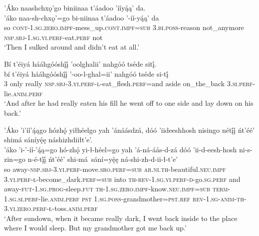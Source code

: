 \ea\label{ex:text2-6-1}
’Áko naashchxǫ’go biniinaa t’áadoo ’ííyą́ą’ da.\\
\gll ’áko	naa-sh-chxǫ’=go	bi-niinaa	t’áadoo	’-íí-yą́ą’	da\\
     so	\textsc{cont}-1.\textsc{sg}.\textsc{zero}.\textsc{impf}-mess\_up.\textsc{cont}.\textsc{impf}=\textsc{sub}	3.\textsc{bi}.\textsc{poss}-reason	not\_anymore	\textsc{nsp}.\textsc{sbj}-1.\textsc{sg}.\textsc{yi}.\textsc{perf}-eat.\textsc{perf}	not\\
\glt `Then I sulked around and didn't eat at all.'
\z

\ea\label{ex:text2-6-2}
Bí t’éiyá hááhgóóshį́į́ ’oolghalii’ nahgóó tséde sitį́.\\
\gll bí	t’éiyá	hááhgóóshį́į́	’-oo-l-ghal=ii’	nahgóó	tséde	si-tį́\\
     3	only	really	\textsc{nsp}.\textsc{sbj}-3.\textsc{yi}.\textsc{perf}-\textsc{l}-eat\_flesh.\textsc{perf}=and	aside	on\_the\_back	3.\textsc{si}.\textsc{perf}-lie.\textsc{anim}.\textsc{perf}\\
\glt `And after he had really eaten his fill he went off to one side and lay down on his back.'
\z

\largerpage
\ea\label{ex:text2-7}
’Áko ’i’íí’ą́ągo hózhǫ́ yiłhéelgo yah ’ánáásdzá, dóó ’iideeshhosh nisingo nétį́į́ ńt’éé’ shimá sáníyę́ę náshizhdiiłt’e’.\\
\gll ’áko	’i-’-íí-’ą́ą=go	hó-zhǫ́	yi-ł-héel=go	yah	’á-ná-áás-d-zá	dóó	’ii-d-eesh-hosh	ni-s-zin=go	n-é-tį́į́	ńt’éé’	shi-má~{sání=yę́ę}	ná-shi-zh-d-ii-ł-t’e’\\
     so	away-\textsc{nsp}.\textsc{sbj}-3.\textsc{yi}.\textsc{perf}-move.\textsc{sro}.\textsc{perf}=\textsc{sub}	\textsc{ar}.\textsc{ni}.\textsc{th}-beautiful.\textsc{neu}.\textsc{impf}	3.\textsc{yi}.\textsc{perf}-\textsc{ł}-become\_dark.\textsc{perf}=\textsc{sub}	into	\textsc{th}-\textsc{rev}-1.\textsc{sg}.\textsc{yi}.\textsc{perf}-\textsc{d}-go.\textsc{sg}.\textsc{perf}	and	away-\textsc{fut}-1.\textsc{sg}.\textsc{prog}-sleep.\textsc{fut}	\textsc{th}-1.\textsc{sg}.\textsc{zero}.\textsc{impf}-know.\textsc{neu}.\textsc{impf}=\textsc{sub}	\textsc{term}-1.\textsc{sg}.\textsc{si}.\textsc{perf}-lie.\textsc{anim}.\textsc{perf}	\textsc{pst}	1.\textsc{sg}.\textsc{poss}-grandmother=\textsc{pst}.\textsc{ref}	\textsc{rev}-1.\textsc{sg}-\textsc{anim}-\textsc{th}-3.\textsc{yi}.\textsc{zero}.\textsc{perf}-\textsc{ł}-toss.\textsc{anim}.\textsc{perf}\\
\glt `After sundown, when it became really dark, I went back inside to the place where I would sleep. But my grandmother got me back up.'
\z


